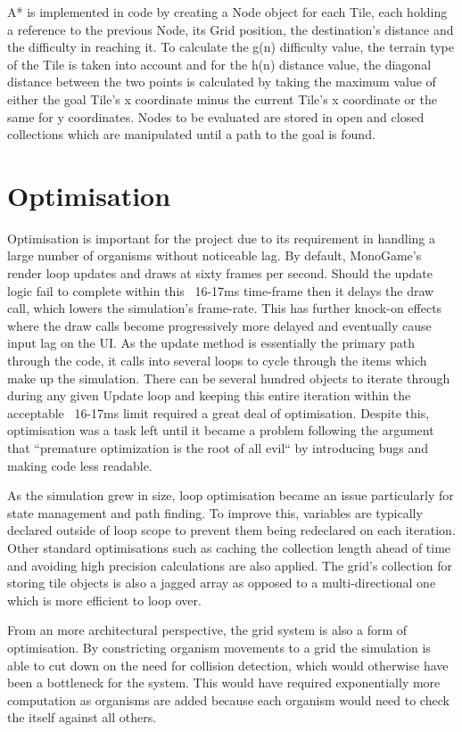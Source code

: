\documentclass[a4paper, oneside, 11pt]{report}
\begin{document}
A* is implemented in code by creating a Node object for each Tile, each holding a reference to the previous Node, its Grid position, the destination's distance and the difficulty in reaching it. To calculate the g(n) difficulty value, the terrain type of the Tile is taken into account and for the h(n) distance value, the diagonal distance between the two points is calculated by taking the maximum value of either the goal Tile's x coordinate minus the current Tile's x coordinate or the same for y coordinates. Nodes to be evaluated are stored in open and closed collections which are manipulated until a path to the goal is found.

\section{Optimisation}\label{optim}
Optimisation is important for the project due to its requirement in handling a large number of organisms without noticeable lag. By default, MonoGame's render loop updates and draws at sixty frames per second. Should the update logic fail to complete within this ~16-17ms time-frame then it delays the draw call, which lowers the simulation's frame-rate. This has further knock-on effects where the draw calls become progressively more delayed and eventually cause input lag on the UI. As the update method is essentially the primary path through the code, it calls into several loops to cycle through the items which make up the simulation. There can be several hundred objects to iterate through during any given Update loop and keeping this entire iteration within the acceptable ~16-17ms limit required a great deal of optimisation. Despite this, optimisation was a task left until it became a problem following the argument that ``premature optimization is the root of all evil`` \cite{knuth} by introducing bugs and making code less readable. 

As the simulation grew in size, loop optimisation became an issue particularly for state management and path finding. To improve this, variables are typically declared outside of loop scope to prevent them being redeclared on each iteration. Other standard optimisations such as caching the collection length ahead of time and avoiding high precision calculations are also applied. The grid's collection for storing tile objects is also a jagged array as opposed to a multi-directional one which is more efficient to loop over.

From an more architectural perspective, the grid system is also a form of optimisation. By constricting organism movements to a grid the simulation is able to cut down on the need for collision detection, which would otherwise have been a bottleneck for the system. This would have required exponentially more computation as organisms are added because each organism would need to check the itself against all others.
\end{document}
